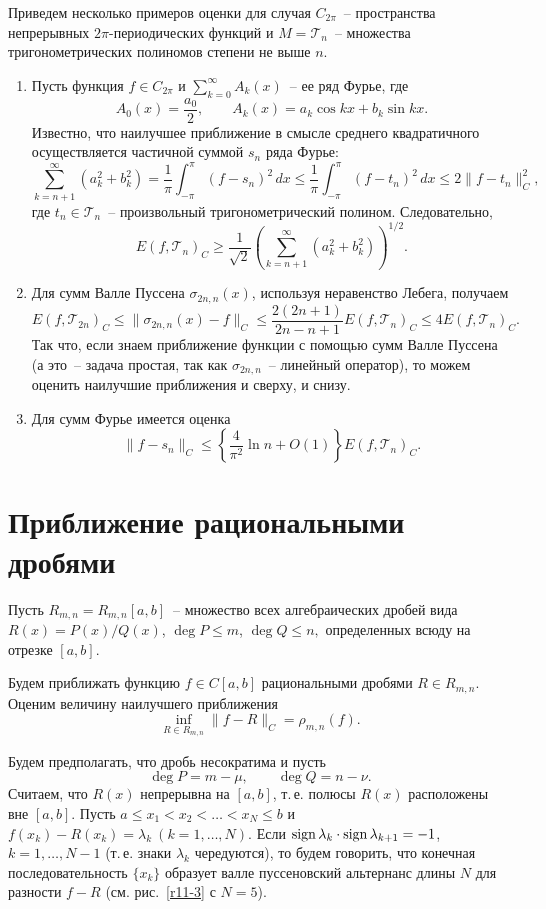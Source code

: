 Приведем несколько примеров оценки для случая {$C_{2\pi}$}~--
пространства непрерывных $2\pi$-периодических функций и {$M=\mathcal T_n$}~--
множества тригонометрических полиномов степени не выше $n$.

\begin{enumerate}
\item Пусть функция {$f\in C_{2\pi}$} и $\sum\limits_{k=0}^\infty A_k(x)$~--
ее ряд Фурье, где
$$
A_0(x)=\frac{a_0}{2},\qquad A_k(x)=a_k\cos kx+b_k\sin kx.
$$
Известно, что наилучшее приближение в смысле среднего квадратичного
осуществляется частичной суммой $s_n$ ряда Фурье:
$$
\sum\limits_{k=n+1}^{\infty} (a_k^2+b_k^2) = \frac{1}{\pi} \int_{-\pi}^{\pi}
(f-s_n)^2\, dx\le \frac{1}{\pi} \int_{-\pi}^{\pi}(f-t_n)^2\, dx\le
2\|f-t_n\|^2_C,
$$
где $t_n\in \mathcal{T}_n$~-- произвольный тригонометрический полином. Следовательно,
$$
E(f,\mathcal T_n)_C\ge \frac{1}{\sqrt{2}}\left( \sum\limits_{k=n+1}^{\infty}
(a_k^2+b_k^2) \right)^{1/2}.
$$

\item Для сумм Валле Пуссена $\sigma_{2n,n}(x)$, используя неравенство Лебега, получаем
$$
E(f,\mathcal T_{2n})_C\le \|\sigma_{2n,n}(x)-f\|_C\le \frac{2(2n+1)}{2n-n+1}
E(f,\mathcal{T}_n)_C\le 4E(f,\mathcal{T}_n)_C.
$$
Так что, если знаем приближение функции с помощью сумм Валле Пуссена
(а это~-- задача простая, так как $\sigma_{2n,n}$~-- линейный оператор), то
можем оценить наилучшие приближения и сверху, и снизу.

\item Для сумм Фурье имеется оценка
$$
\|f-s_n\|_C\le \left\{ \frac{4}{\pi^2} \ln n+O(1)\right\} E(f,\mathcal{T}_n)_C.
$$
\end{enumerate}


\section{Приближение рациональными дробями}

Пусть $R_{m,n}=R_{m,n}[a,b]$~-- множество всех алгебраических дробей
вида $R(x)=P(x)/Q(x)$, $\deg P\le m$, $\deg Q\le n,$
определенных всюду на отрезке $[a,b]$.

Будем приближать функцию $f\in C[a,b]$ рациональными дробями $R\in
R_{m,n}$. Оценим величину наилучшего приближения
$$
\inf_{R\in R_{m,n}} \|f-R\|_C=\rho_{m,n}(f).
$$

Будем предполагать, что дробь несократима и пусть
$$
\deg P=m-\mu,\qquad \deg Q=n-\nu.
$$
Считаем, что $R(x)$ непрерывна на $[a,b]$, т.\,е. полюсы $R(x)$ расположены
вне $[a,b]$. Пусть $a\le x_1< x_2<\ldots <x_N \le b$ и
$f(x_k)-R(x_k)=\lambda_k\ (k=1,\ldots,N).$ Если ${\rm sign \, }\lambda_k
\cdot {\rm sign \, }\lambda_{k+1}=-1$,~ $k=1,\ldots,N-1$ (т.\,е. знаки $\lambda_k$ чередуются),
то будем говорить, что конечная последовательность $\{x_k\}$ образует
валле пуссеновский альтернанс длины $N$ {для разности $f-R$} (см. рис.~\ref{r11-3} с $N=5$).


